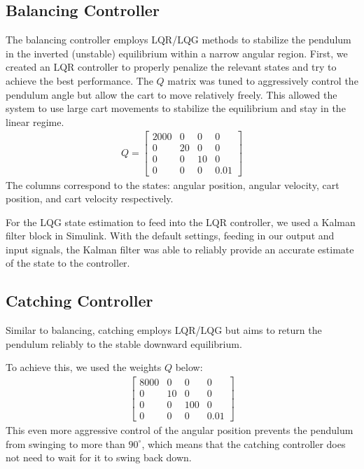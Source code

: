 \documentclass[12pt]{article}
\begin{document}
\subsection{Balancing Controller}
The balancing controller employs LQR/LQG methods to stabilize the pendulum in the inverted (unstable) equilibrium within a narrow angular region. 
First, we created an LQR controller to properly penalize the relevant states and try to achieve the best performance. 
The $Q$ matrix was tuned to aggressively control the pendulum angle but allow the cart to move relatively freely. 
This allowed the system to use large cart movements to stabilize the equilibrium and stay in the linear regime.
\begin{align*}
    Q = \begin{bmatrix}
        2000 & 0 & 0 & 0 \\
        0 & 20 & 0 & 0 \\
        0 & 0 & 10 & 0 \\
        0 & 0 & 0 & 0.01
    \end{bmatrix}
\end{align*}
The columns correspond to the states: angular position, angular velocity, cart position, and cart velocity respectively.

For the LQG state estimation to feed into the LQR controller, we used a Kalman filter block in Simulink. 
With the default settings, feeding in our output and input signals, the Kalman filter was able to reliably provide an
accurate estimate of the state to the controller.


\subsection{Catching Controller}
Similar to balancing, catching employs LQR/LQG but aims to return the pendulum reliably to the stable downward equilibrium. 

To achieve this, we used the weights $Q$ below:
\begin{align*}
    \begin{bmatrix}
        8000 & 0 & 0 & 0 \\
        0 & 10 & 0 & 0 \\
        0 & 0 & 100 & 0 \\
        0 & 0 & 0 & 0.01
    \end{bmatrix}
\end{align*}
This even more aggressive control of the angular position prevents the pendulum from swinging to more than $90^\circ$, which means that the catching controller does not need to wait for it to swing back down.
\end{document}
